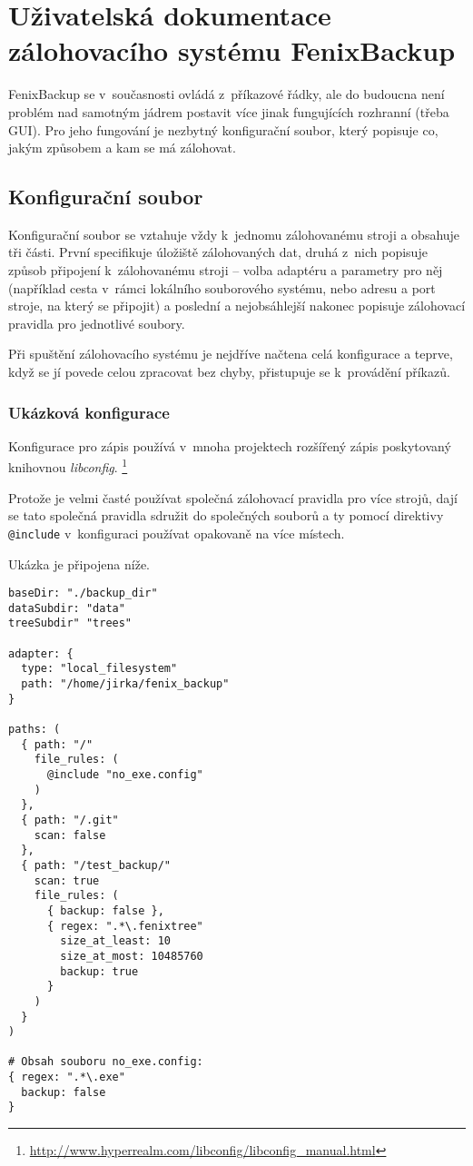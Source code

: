 \chapter{Uživatelská dokumentace zálohovacího systému FenixBackup}

FenixBackup se v~současnosti ovládá z~příkazové řádky, ale do budoucna není
problém nad samotným jádrem postavit více jinak fungujících rozhranní (třeba
GUI). Pro jeho fungování je nezbytný konfigurační soubor, který popisuje co,
jakým způsobem a kam se má zálohovat.

\section{Konfigurační soubor}

Konfigurační soubor se vztahuje vždy k~jednomu zálohovanému stroji a obsahuje
tři části. První specifikuje úložiště zálohovaných dat, druhá z~nich popisuje
způsob připojení k~zálohovanému stroji -- volba adaptéru a parametry pro něj
(například cesta v~rámci lokálního souborového systému, nebo adresu a port
stroje, na který se připojit) a poslední a nejobsáhlejší nakonec popisuje
zálohovací pravidla pro jednotlivé soubory.

Při spuštění zálohovacího systému je nejdříve načtena celá konfigurace a teprve,
když se jí povede celou zpracovat bez chyby, přistupuje se k~provádění příkazů.

\subsection{Ukázková konfigurace}

Konfigurace pro zápis používá v~mnoha projektech rozšířený zápis poskytovaný
knihovnou {\it libconfig}.%
\footnote{\url{http://www.hyperrealm.com/libconfig/libconfig_manual.html}}

Protože je velmi časté používat společná zálohovací pravidla pro více strojů,
dají se tato společná pravidla sdružit do společných souborů a ty pomocí
direktivy \texttt{@include} v~konfiguraci používat opakovaně na více místech.

Ukázka je připojena níže.

\begin{verbatim}
baseDir: "./backup_dir"
dataSubdir: "data"
treeSubdir" "trees"

adapter: {
  type: "local_filesystem"
  path: "/home/jirka/fenix_backup"
}

paths: (
  { path: "/"
    file_rules: (
      @include "no_exe.config"
    )
  },
  { path: "/.git"
    scan: false
  },
  { path: "/test_backup/"
    scan: true
    file_rules: (
      { backup: false },
      { regex: ".*\.fenixtree"
        size_at_least: 10
        size_at_most: 10485760
        backup: true
      }
    )
  }
)

# Obsah souboru no_exe.config:
{ regex: ".*\.exe"
  backup: false
}
\end{verbatim}

